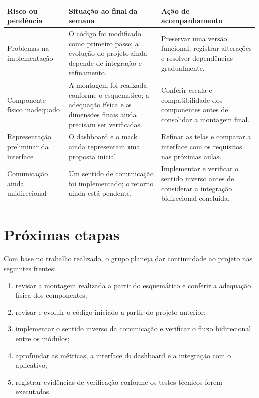 \documentclass[11pt,a4paper]{article}
\begin{document}
\begin{tabularx}{\textwidth}{|L{4.0cm}|Y|L{4.2cm}|}
\hline
{}\textbf{Risco ou pendência} & \textbf{Situação ao final da semana} & \textbf{Ação de acompanhamento}\\
\hline
Problemas na implementação & O código foi modificado como primeiro passo; a evolução do projeto ainda depende de integração e refinamento. & Preservar uma versão funcional, registrar alterações e resolver dependências gradualmente.\\
\hline
Componente físico inadequado & A montagem foi realizada conforme o esquemático; a adequação física e as dimensões finais ainda precisam ser verificadas. & Conferir escala e compatibilidade dos componentes antes de consolidar a montagem final.\\
\hline
Representação preliminar da interface & O dashboard e o mock ainda representam uma proposta inicial. & Refinar as telas e comparar a interface com os requisitos nas próximas aulas.\\
\hline
Comunicação ainda unidirecional & Um sentido de comunicação foi implementado; o retorno ainda está pendente. & Implementar e verificar o sentido inverso antes de considerar a integração bidirecional concluída.\\
\hline
\end{tabularx}

\section{Próximas etapas}

Com base no trabalho realizado, o grupo planeja dar continuidade ao projeto nas seguintes frentes:

\begin{enumerate}
\item revisar a montagem realizada a partir do esquemático e conferir a adequação física dos componentes;
\item revisar e evoluir o código iniciado a partir do projeto anterior;
\item implementar o sentido inverso da comunicação e verificar o fluxo bidirecional entre os módulos;
\item aprofundar as métricas, a interface do dashboard e a integração com o aplicativo;
\item registrar evidências de verificação conforme os testes técnicos forem executados.
\end{enumerate}
\end{document}
